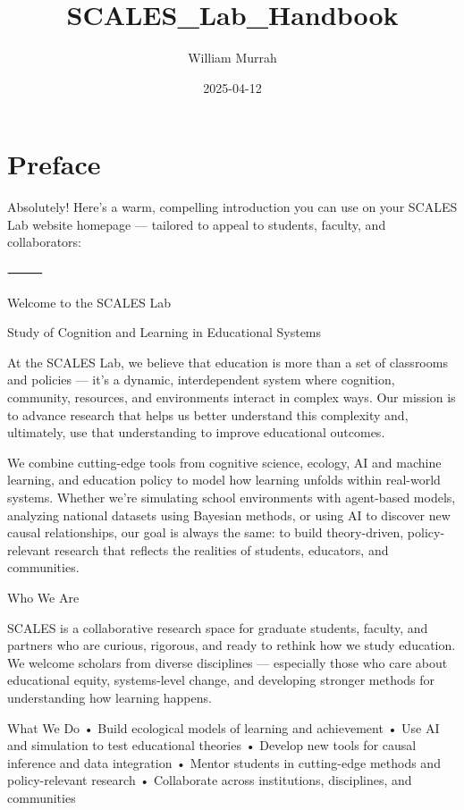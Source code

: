 \documentclass[
  letterpaper,
  DIV=11,
  numbers=noendperiod]{scrreprt}
\title{SCALES\_Lab\_Handbook}
\author{William Murrah}
\date{2025-04-12}
\renewcommand*\contentsname{Table of contents}
\newcommand\contentsname{Table of contents}
\begin{document}
\maketitle

\renewcommand*\contentsname{Table of contents}
{
\hypersetup{linkcolor=}
\setcounter{tocdepth}{2}
\tableofcontents
}


\chapter*{Preface}\label{preface}


Absolutely! Here's a warm, compelling introduction you can use on your
SCALES Lab website homepage --- tailored to appeal to students, faculty,
and collaborators:

⸻

Welcome to the SCALES Lab

Study of Cognition and Learning in Educational Systems

At the SCALES Lab, we believe that education is more than a set of
classrooms and policies --- it's a dynamic, interdependent system where
cognition, community, resources, and environments interact in complex
ways. Our mission is to advance research that helps us better understand
this complexity and, ultimately, use that understanding to improve
educational outcomes.

We combine cutting-edge tools from cognitive science, ecology, AI and
machine learning, and education policy to model how learning unfolds
within real-world systems. Whether we're simulating school environments
with agent-based models, analyzing national datasets using Bayesian
methods, or using AI to discover new causal relationships, our goal is
always the same: to build theory-driven, policy-relevant research that
reflects the realities of students, educators, and communities.

Who We Are

SCALES is a collaborative research space for graduate students, faculty,
and partners who are curious, rigorous, and ready to rethink how we
study education. We welcome scholars from diverse disciplines ---
especially those who care about educational equity, systems-level
change, and developing stronger methods for understanding how learning
happens.

What We Do • Build ecological models of learning and achievement • Use
AI and simulation to test educational theories • Develop new tools for
causal inference and data integration • Mentor students in cutting-edge
methods and policy-relevant research • Collaborate across institutions,
disciplines, and communities
\end{document}

